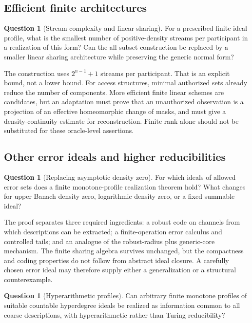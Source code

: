 \documentclass[11pt,letterpaper]{article}
\theoremstyle{plain}
\theoremstyle{definition}
\newtheorem{question}[theorem]{Question}
\theoremstyle{remark}
\numberwithin{equation}{section}
\begin{document}
\subsection{Efficient finite architectures}

\begin{question}[Stream complexity and linear sharing]\label{cr11:q:efficiency}
For a prescribed finite ideal profile, what is the smallest number of
positive-density streams per participant in a realization of this form?
Can the all-subset construction be replaced by a smaller linear sharing
architecture while preserving the generic normal form?
\end{question}

The construction uses $2^{n-1}+1$ streams per participant. That is an
explicit bound, not a lower bound. For access structures, minimal authorized
sets already reduce the number of components. More efficient finite linear
schemes are candidates, but an adaptation must prove that an unauthorized
observation is a projection of an effective homeomorphic change of masks,
and must give a density-continuity estimate for reconstruction. Finite rank
alone should not be substituted for these oracle-level assertions.

\subsection{Other error ideals and higher reducibilities}

\begin{question}[Replacing asymptotic density zero]\label{cr11:q:errors}
For which ideals of allowed error sets does a finite monotone-profile
realization theorem hold? What changes for upper Banach density zero,
logarithmic density zero, or a fixed summable ideal?
\end{question}

The proof separates three required ingredients: a robust code on channels
from which descriptions can be extracted; a finite-operation error
calculus and controlled tails; and an analogue of the robust-radius plus
generic-core mechanism. The finite sharing algebra survives unchanged,
but the compactness and coding properties do not follow from abstract
ideal closure. A carefully chosen error ideal may therefore supply either
a generalization or a structural counterexample.

\begin{question}[Hyperarithmetic profiles]\label{cr11:q:hyper}
Can arbitrary finite monotone profiles of suitable countable
hyperdegree ideals be realized as information common to all coarse
descriptions, with hyperarithmetic rather than Turing reducibility?
\end{question}
\end{document}
